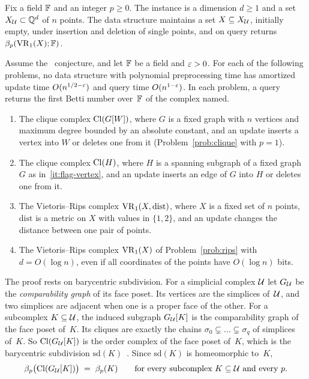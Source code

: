 \begin{problem}\label{prob:rips}
Fix a field $\mathbb{F}$ and an integer $p\ge0$.
The instance is a dimension $d\ge1$ and a set $X_{\mathcal{U}}\subset\mathbb{Q}^d$ of $n$ points.
The data structure maintains a set $X\subseteq X_{\mathcal{U}}$, initially empty, under insertion and deletion of single points, and on query returns $\beta_p(\mathrm{VR}_1(X);\mathbb{F})$.
\end{problem}

\begin{theorem}\label{thm:flag}
Assume the \OMv\ conjecture, and let $\mathbb{F}$ be a field and $\varepsilon>0$.
For each of the following problems, no data structure with polynomial preprocessing time has amortized update time $O(n^{1/2-\varepsilon})$ and query time $O(n^{1-\varepsilon})$.
In each problem, a query returns the first Betti number over~$\mathbb{F}$ of the complex named.
\begin{enumerate}[label=(\roman*)]
\item\label{it:flag-vertex} The clique complex $\mathrm{Cl}(G[W])$, where $G$ is a fixed graph with $n$ vertices and maximum degree bounded by an absolute constant, and an update inserts a vertex into $W$ or deletes one from it (Problem~\ref{prob:clique} with $p=1$).
\item\label{it:flag-edge} The clique complex $\mathrm{Cl}(H)$, where $H$ is a spanning subgraph of a fixed graph $G$ as in~\ref{it:flag-vertex}, and an update inserts an edge of $G$ into $H$ or deletes one from it.
\item\label{it:flag-metric} The Vietoris--Rips complex $\mathrm{VR}_1(X,\mathrm{dist})$, where $X$ is a fixed set of $n$ points, $\mathrm{dist}$ is a metric on $X$ with values in $\{1,2\}$, and an update changes the distance between one pair of points.
\item\label{it:flag-euclid} The Vietoris--Rips complex $\mathrm{VR}_1(X)$ of Problem~\ref{prob:rips} with $d=O(\log n)$, even if all coordinates of the points have $O(\log n)$ bits.
\end{enumerate}
\end{theorem}

The proof rests on barycentric subdivision.
For a simplicial complex $\mathcal{U}$ let $G_{\mathcal{U}}$ be the \emph{comparability graph} of its face poset.
Its vertices are the simplices of~$\mathcal{U}$, and two simplices are adjacent when one is a proper face of the other.
For a subcomplex $K\subseteq\mathcal{U}$, the induced subgraph $G_{\mathcal{U}}[K]$ is the comparability graph of the face poset of~$K$.
Its cliques are exactly the chains $\sigma_0\subsetneq\dots\subsetneq\sigma_q$ of simplices of~$K$.
So $\mathrm{Cl}(G_{\mathcal{U}}[K])$ is the order complex of the face poset of~$K$, which is the barycentric subdivision $\mathrm{sd}(K)$~\cite{Koz08}.
Since $\mathrm{sd}(K)$ is homeomorphic to~$K$,
\begin{equation}\label{eq:sd}
  \beta_p\bigl(\mathrm{Cl}(G_{\mathcal{U}}[K])\bigr)\;=\;\beta_p(K)\qquad\text{for every subcomplex }K\subseteq\mathcal{U}\text{ and every }p.
\end{equation}

